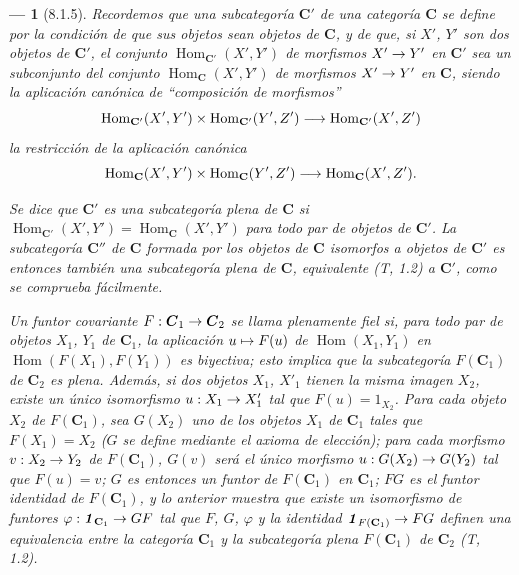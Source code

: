 \documentclass[10pt,oneside,openany]{book}
\makeatletter
\theoremstyle{egaenv}\newtheorem*{env}{---}
\theoremstyle{egastatement}
\theoremstyle{egadescription}
\newcommand{\oldpage}[2][]{\marginnote{\normalfont\scriptsize\textbf{#1}\,|\,#2}\ignorespaces}
\let\ega@shortmapsto\mapsto
\renewcommand{\to}{\mathchoice{\longrightarrow}{\rightarrow}{\rightarrow}{\rightarrow}}
\renewcommand{\mapsto}{\mathchoice{\longmapsto}{\ega@shortmapsto}{\ega@shortmapsto}{\ega@shortmapsto}}
\makeatother
\begin{document}
\begin{env}[8.1.5]
\label{0.8.1.5}
\label{0.8.1.5-fr}
Recordemos que una \emph{subcategoría} $\boldsymbol{C}'$ de una categoría $\boldsymbol{C}$ se define por la condición de que sus objetos
sean objetos de $\boldsymbol{C}$, y de que, si $X'$, $Y'$ son dos objetos de $\boldsymbol{C}'$, el conjunto
$\operatorname{Hom}_{\mathbf{C}'}(X',Y')$ de morfismos $X'\to Y'$ \emph{en $\boldsymbol{C}'$} sea un subconjunto del conjunto $\operatorname{Hom}_{\mathbf{C}}(X',Y')$ de
morfismos $X'\to Y'$ \emph{en $\boldsymbol{C}$}, siendo la aplicación canónica de ``composición de morfismos''
\[
  \operatorname{Hom}_{\mathbf{C}'}(X',Y')\times\operatorname{Hom}_{\mathbf{C}'}(Y',Z')
  \to\operatorname{Hom}_{\mathbf{C}'}(X',Z')
\]
\oldpage[0\textsubscript{III}]{7}
la restricción de la aplicación canónica
\[
  \operatorname{Hom}_{\mathbf{C}}(X',Y')\times\operatorname{Hom}_{\mathbf{C}}(Y',Z')
  \to\operatorname{Hom}_{\mathbf{C}}(X',Z').
\]

Se dice que $\boldsymbol{C}'$ es una subcategoría \emph{plena} de $\boldsymbol{C}$ si $\operatorname{Hom}_{\mathbf{C}'}(X',Y')=\operatorname{Hom}_{\mathbf{C}}(X',Y')$ para todo
par de objetos de $\boldsymbol{C}'$. La subcategoría $\boldsymbol{C}''$ de $\boldsymbol{C}$ formada por los objetos de $\boldsymbol{C}$ isomorfos a
objetos de $\boldsymbol{C}'$ es entonces también una subcategoría plena de $\boldsymbol{C}$, \emph{equivalente} (T, 1.2) a $\boldsymbol{C}'$, como se
comprueba fácilmente.

Un funtor covariante $F:\boldsymbol{C}_1\to\boldsymbol{C}_2$ se llama \emph{plenamente fiel} si, para todo par de objetos
$X_1$, $Y_1$ de $\boldsymbol{C}_1$, la aplicación $u\mapsto F(u)$ de $\operatorname{Hom}(X_1,Y_1)$ en $\operatorname{Hom}(F(X_1),F(Y_1))$ es
\emph{biyectiva}; esto implica que la subcategoría $F(\boldsymbol{C}_1)$ de $\boldsymbol{C}_2$ es \emph{plena}. Además,
si dos objetos $X_1$, $X'_1$ tienen la misma imagen $X_2$, existe un único isomorfismo
$u:X_1\to X'_1$ tal que $F(u)=1_{X_2}$. Para cada objeto $X_2$ de $F(\boldsymbol{C}_1)$, sea $G(X_2)$ uno de
los objetos $X_1$ de $\boldsymbol{C}_1$ tales que $F(X_1)=X_2$ ($G$ se define mediante el axioma de elección); para
cada morfismo $v:X_2\to Y_2$ de $F(\boldsymbol{C}_1)$, $G(v)$ será el único morfismo $u:G(X_2)\to G(Y_2)$ tal
que $F(u)=v$; $G$ es entonces un \emph{funtor} de $F(\boldsymbol{C}_1)$ en $\boldsymbol{C}_1$; $FG$ es el funtor identidad de
$F(\boldsymbol{C}_1)$, y lo anterior muestra que existe un isomorfismo de funtores $\varphi:\boldsymbol{\mathit{1}}_{\mathbf{C}_1}\to GF$
tal que $F$, $G$, $\varphi$ y la identidad $\boldsymbol{\mathit{1}}_{F(\mathbf{C}_1)}\to FG$ definen una \emph{equivalencia} entre
la categoría $\boldsymbol{C}_1$ y la subcategoría plena $F(\boldsymbol{C}_1)$ de $\boldsymbol{C}_2$ (T, 1.2).
\end{env}
\end{document}
